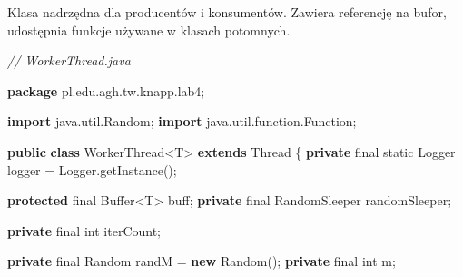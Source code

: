 \documentclass[11pt]{article}
\newenvironment{Shaded}{}{}
\newcommand{\KeywordTok}[1]{\textcolor[rgb]{0.00,0.44,0.13}{\textbf{{#1}}}}
\newcommand{\DataTypeTok}[1]{\textcolor[rgb]{0.56,0.13,0.00}{{#1}}}
\newcommand{\CommentTok}[1]{\textcolor[rgb]{0.38,0.63,0.69}{\textit{{#1}}}}
\newcommand{\FunctionTok}[1]{\textcolor[rgb]{0.02,0.16,0.49}{{#1}}}
\newcommand{\NormalTok}[1]{{#1}}
\newcommand{\ImportTok}[1]{{#1}}
\newcommand{\OperatorTok}[1]{\textcolor[rgb]{0.40,0.40,0.40}{{#1}}}
\newcommand{\BuiltInTok}[1]{{#1}}
\begin{document}
Klasa nadrzędna dla producentów i konsumentów. Zawiera referencję na
bufor, udostępnia funkcje używane w klasach potomnych.

\begin{Shaded}
\begin{Highlighting}[]
\CommentTok{// WorkerThread.java}

\KeywordTok{package}\ImportTok{ pl}\OperatorTok{.}\ImportTok{edu}\OperatorTok{.}\ImportTok{agh}\OperatorTok{.}\ImportTok{tw}\OperatorTok{.}\ImportTok{knapp}\OperatorTok{.}\ImportTok{lab4}\OperatorTok{;}

\KeywordTok{import} \ImportTok{java}\OperatorTok{.}\ImportTok{util}\OperatorTok{.}\ImportTok{Random}\OperatorTok{;}
\KeywordTok{import} \ImportTok{java}\OperatorTok{.}\ImportTok{util}\OperatorTok{.}\ImportTok{function}\OperatorTok{.}\ImportTok{Function}\OperatorTok{;}

\KeywordTok{public} \KeywordTok{class}\NormalTok{ WorkerThread}\OperatorTok{\textless{}}\NormalTok{T}\OperatorTok{\textgreater{}} \KeywordTok{extends} \BuiltInTok{Thread} \OperatorTok{\{}
    \KeywordTok{private} \DataTypeTok{final} \DataTypeTok{static} \BuiltInTok{Logger}\NormalTok{ logger }\OperatorTok{=} \BuiltInTok{Logger}\OperatorTok{.}\FunctionTok{getInstance}\OperatorTok{();}

    \KeywordTok{protected} \DataTypeTok{final} \BuiltInTok{Buffer}\OperatorTok{\textless{}}\NormalTok{T}\OperatorTok{\textgreater{}}\NormalTok{ buff}\OperatorTok{;}
    \KeywordTok{private} \DataTypeTok{final}\NormalTok{ RandomSleeper randomSleeper}\OperatorTok{;}

    \KeywordTok{private} \DataTypeTok{final} \DataTypeTok{int}\NormalTok{ iterCount}\OperatorTok{;}

    \KeywordTok{private} \DataTypeTok{final} \BuiltInTok{Random}\NormalTok{ randM }\OperatorTok{=} \KeywordTok{new} \BuiltInTok{Random}\OperatorTok{();}
    \KeywordTok{private} \DataTypeTok{final} \DataTypeTok{int}\NormalTok{ m}\OperatorTok{;}


\end{Highlighting}
\end{Shaded}
\end{document}

